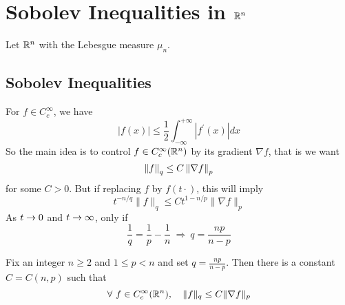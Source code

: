 \chapter{Sobolev Inequalities in \texorpdfstring{$\mathbb{R}^n$}{Rn}} 
Let $\mathbb{R}^n$ with the Lebesgue measure $\mu_n$.

\section{Sobolev Inequalities}

For $f \in C_c^\infty$, we have
\begin{equation*}
	|f(x)| \leq \frac{1}{2} \int_{-\infty}^{+\infty}\left|f^{\prime}(x)\right| dx
\end{equation*}
So the main idea is to control $f \in C_c^\infty(\mathbb{R}^n)$ by its gradient $\nabla f$, that is we want
\begin{equation*}
	\left\lVert f\right\lVert_q \leq C\left\lVert\nabla f\right\lVert_p
\end{equation*}
for some $C> 0$. But if replacing $f$ by $f(t\cdot)$, this will imply
\begin{equation*}
	t^{-n / q}\|f\|_q \leq C t^{1-n / p}\|\nabla f\|_p
\end{equation*}
As $t \rightarrow 0$ and $t \rightarrow \infty$, only if
\begin{equation*}
	\frac{1}{q}=\frac{1}{p}-\frac{1}{n} ~\Rightarrow~ q=\frac{n p}{n-p}
\end{equation*}

\begin{thm}\label{thm:sobovineq}
	Fix an integer $n \geq 2$ and $1 \leq p < n$ and set $q = \frac{np}{n-p}$. Then there is a constant $C=C(n,p)$ such that
	\begin{equation*}
		\forall~f \in C_c^\infty(\mathbb{R}^n),\quad \|f\|_q \leq C\|\nabla f\|_{p}
	\end{equation*}
\end{thm}


